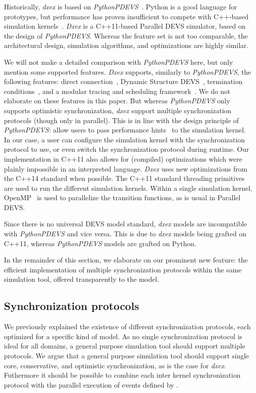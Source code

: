 Historically, \textit{dxex} is based on \textit{PythonPDEVS}~\cite{PythonPDEVS}.
Python is a good language for prototypes, but performance has proven insufficient to compete with C++-based simulation kernels~\cite{MasterThesis}.
\textit{Dxex} is a C++11-based \textsf{Parallel DEVS} simulator, based on the design of \textit{PythonPDEVS}.
Whereas the feature set is not too comparable, the architectural design, simulation algorithms, and optimizations are highly similar.

We will not make a detailed comparison with \textit{PythonPDEVS} here, but only mention some supported features.
\textit{Dxex} supports, similarly to \textit{PythonPDEVS}, the following features: direct connection~\cite{SymbolicFlattening}, \textsf{Dynamic Structure DEVS}~\cite{DSDEVS}, termination conditions~\cite{JDF}, and a modular tracing and scheduling framework~\cite{PythonPDEVS}.
We do not elaborate on these features in this paper.
But whereas \textit{PythonPDEVS} only supports optimistic synchronization, \textit{dxex} support multiple synchronization protocols (though only in parallel).
This is in line with the design principle of \textit{PythonPDEVS}: allow users to pass performance hints~\cite{PythonPDEVS_ACTIMS} to the simulation kernel.
In our case, a user can configure the simulation kernel with the synchronization protocol to use, or even switch the synchronization protocol during runtime.
Our implementation in C++11 also allows for (compiled) optimizations which were plainly impossible in an interpreted language.
\textit{Dxex} uses new optimizations from the C++14 standard when possible.
The C++11 standard threading primitives are used to run the different simulation kernels.
Within a single simulation kernel, OpenMP~\cite{openmp4} is used to parallelize the transition functions, as is usual in \textsf{Parallel DEVS}.

Since there is no universal \textsf{DEVS} model standard, \textit{dxex} models are incompatible with \textit{PythonPDEVS} and vice versa.
This is due to \textit{dxex} models being grafted on C++11, whereas \textit{PythonPDEVS} models are grafted on Python.

In the remainder of this section, we elaborate on our prominent new feature: the efficient implementation of multiple synchronization protocols within the same simulation tool, offered transparently to the model.

\subsection{Synchronization protocols}
We previously explained the existence of different synchronization protocols, each optimized for a specific kind of model.
As no single synchronization protocol is ideal for all domains, a general purpose simulation tool should support multiple protocols.
We argue that a general purpose simulation tool should support single core, conservative, and optimistic synchronization, as is the case for \textit{dxex}. Futhermore it should be possible to combine each inter kernel synchronization protocol with the parallel execution of events defined by \pSim.

